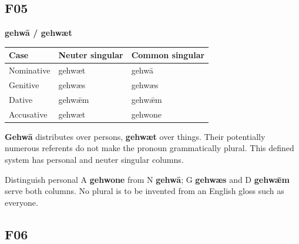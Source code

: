 \subsection*{F05}

\par\begin{minipage}{\linewidth}\raggedright
\textbf{gehwā /\allowbreak{} gehwæt}

\par\begingroup
\fontsize{10.5}{13.2}\selectfont
\setlength{\LTleft}{0pt}\setlength{\LTright}{\fill}
\noindent
\begin{tabular}{@{}>{\raggedright\arraybackslash}p{39.459mm}>{\raggedright\arraybackslash}p{39.459mm}>{\raggedright\arraybackslash}p{39.459mm}@{}}
\toprule
\textbf{Case} & \textbf{Neuter singular} & \textbf{Common singular} \\
\midrule
Nominative & gehwæt & gehwā \\
Genitive & gehwæs & gehwæs \\
Dative & gehwǣm & gehwǣm \\
Accusative & gehwæt & gehwone \\
\bottomrule
\end{tabular}
\par\endgroup
\textbf{Gehwā} distributes over persons, \textbf{gehwæt} over things. Their potentially numerous referents do not make the pronoun grammatically plural. This defined system has personal and neuter singular columns.

Distinguish personal A \textbf{gehwone} from N \textbf{gehwā}; G \textbf{gehwæs} and D \textbf{gehwǣm} serve both columns. No plural is to be invented from an English gloss such as everyone.

\end{minipage}\par\addvspace{4pt}

\subsection*{F06}

